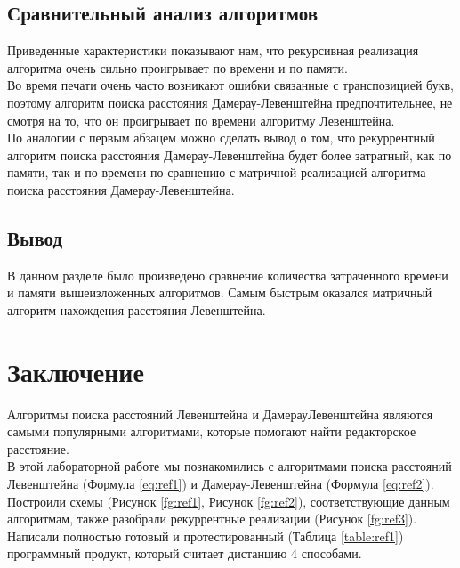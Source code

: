 \documentclass[12pt,a4paper]{report}
\begin{document}
\begin{figure}[ht!]
\end{figure}

\section{Сравнительный анализ алгоритмов}

Приведенные характеристики показывают нам, что рекурсивная реализация алгоритма очень сильно проигрывает по времени и по памяти.\\
Во время печати очень часто возникают ошибки связанные с транспозицией букв, поэтому алгоритм поиска расстояния Дамерау-Левенштейна предпочтительнее, не смотря на то, что он проигрывает по времени алгоритму Левенштейна.\\
По аналогии с первым абзацем можно сделать вывод о том, что рекуррентный алгоритм поиска расстояния Дамерау-Левенштейна будет более затратный, как по памяти, так и по времени по сравнению с матричной реализацией алгоритма поиска расстояния Дамерау-Левенштейна.


\section{Вывод}

В данном разделе было произведено сравнение количества затраченного времени и памяти вышеизложенных алгоритмов.
Самым быстрым оказался матричный алгоритм нахождения расстояния Левенштейна.

\newpage
\chapter*{Заключение}

Алгоритмы поиска расстояний Левенштейна и ДамерауЛевенштейна являются самыми популярными алгоритмами, которые помогают найти редакторское расстояние. \\
В этой лабораторной работе мы познакомились с алгоритмами поиска расстояний Левенштейна (Формула \ref{eq:ref1}) и Дамерау-Левенштейна (Формула \ref{eq:ref2}).
Построили схемы (Рисунок \ref{fg:ref1}, Рисунок \ref{fg:ref2}), соответствующие данным алгоритмам, также разобрали рекуррентные реализации (Рисунок \ref{fg:ref3}).
Написали полностью готовый и протестированный (Таблица \ref{table:ref1}) программный продукт, который считает дистанцию 4 способами.
\end{document}
